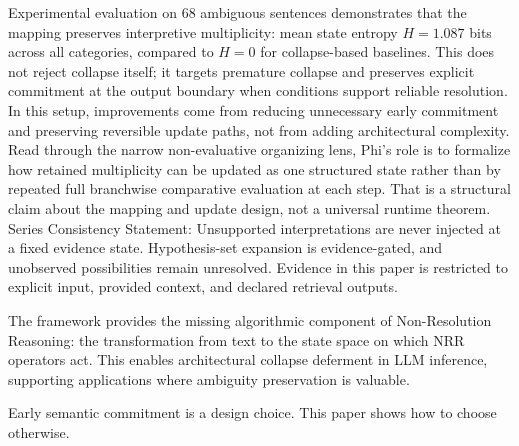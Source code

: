 \documentclass[11pt,a4paper]{article}
\begin{document}
Experimental evaluation on 68 ambiguous sentences demonstrates that the mapping 
preserves interpretive multiplicity: mean state entropy $H = 1.087$ bits across 
all categories, compared to $H = 0$ for collapse-based baselines.
This does not reject collapse itself; it targets premature collapse and preserves explicit commitment at the output boundary when conditions support reliable resolution.
In this setup, improvements come from reducing unnecessary early commitment and preserving reversible update paths, not from adding architectural complexity. Read through the narrow non-evaluative organizing lens, Phi's role is to formalize how retained multiplicity can be updated as one structured state rather than by repeated full branchwise comparative evaluation at each step. That is a structural claim about the mapping and update design, not a universal runtime theorem.
Series Consistency Statement: Unsupported interpretations are never injected at a fixed evidence state. Hypothesis-set expansion is evidence-gated, and unobserved possibilities remain unresolved. Evidence in this paper is restricted to explicit input, provided context, and declared retrieval outputs.

The framework provides the missing algorithmic component of Non-Resolution Reasoning: 
the transformation from text to the state space on which NRR operators act. This 
enables architectural collapse deferment in LLM inference, supporting applications 
where ambiguity preservation is valuable.

Early semantic commitment is a design choice. This paper shows how to choose otherwise.
\end{document}
